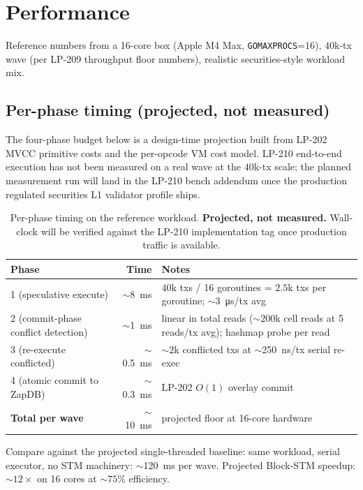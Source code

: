 \section{Performance}

Reference numbers from a 16-core box (Apple M4 Max,
\texttt{GOMAXPROCS}{=}$16$), $40$k-tx wave (per LP-209 throughput
floor numbers), realistic securities-style workload mix.

\subsection{Per-phase timing (projected, not measured)}

The four-phase budget below is a design-time projection built from
LP-202 MVCC primitive costs and the per-opcode VM cost model. LP-210
end-to-end execution has not been measured on a real wave at the
$40$k-tx scale; the planned measurement run will land in the LP-210
bench addendum once the production regulated securities L1 validator profile ships.

\begin{table}[h]
\centering
\small
\begin{tabular}{@{}lrp{6cm}@{}}
\toprule
\textbf{Phase} & \textbf{Time} & \textbf{Notes} \\
\midrule
1 (speculative execute) & $\sim$\SI{8}{\milli\second} & $40$k txs / 16 goroutines = $2.5$k txs per goroutine; $\sim$\SI{3}{\micro\second}/tx avg \\
2 (commit-phase conflict detection) & $\sim$\SI{1}{\milli\second} & linear in total reads ($\sim 200$k cell reads at 5 reads/tx avg); hashmap probe per read \\
3 (re-execute conflicted) & $\sim$\SI{0.5}{\milli\second} & $\sim 2$k conflicted txs at $\sim$\SI{250}{\nano\second}/tx serial re-exec \\
4 (atomic commit to ZapDB) & $\sim$\SI{0.3}{\milli\second} & LP-202 $O(1)$ overlay commit \\
\midrule
\textbf{Total per wave} & $\sim$\SI{10}{\milli\second} & projected floor at 16-core hardware \\
\bottomrule
\end{tabular}
\caption{Per-phase timing on the reference workload.
\textbf{Projected, not measured.} Wall-clock will be verified
against the LP-210 implementation tag once production traffic is
available.}
\label{tab:perphase}
\end{table}

Compare against the projected single-threaded baseline: same workload, serial
executor, no STM machinery: $\sim$\SI{120}{\milli\second} per wave.
Projected Block-STM speedup: $\sim 12\times$ on 16 cores at $\sim 75\%$
efficiency.

